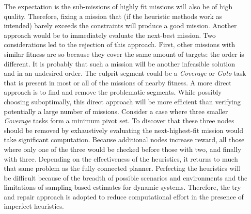 \documentclass{tamuccthesis}
\begin{document}
The expectation is the sub-missions of highly fit missions will also be of high quality. Therefore, fixing a mission that (if the heuristic methods work as intended) barely exceeds the constraints will produce a good mission. Another approach would be to immediately evaluate the next-best mission. Two considerations led to the rejection of this approach. First, other missions with similar fitness are so because they cover the same amount of targets: the order is different. It is probably that such a mission will be another infeasible solution and in an undesired order. The culprit segment could be a \textit{Coverage} or \textit{Goto} task that is present in most or all of the missions of nearby fitness. A more direct approach is to find and remove the problematic segments. While possibly choosing suboptimally, this direct approach will be more efficient than verifying potentially a large number of missions. Consider a case where three smaller \textit{Coverage} tasks form a minimum pivot set. To discover that these three nodes should be removed by exhaustively evaluating the next-highest-fit mission would take significant computation. Because additional nodes increase reward, all those where only one of the three would be checked before those with two, and finally with three. Depending on the effectiveness of the heuristics, it returns to much that same problem as the fully connected planner. Perfecting the heuristics will be difficult because of the breadth of possible scenarios and environments and the limitations of sampling-based estimates for dynamic systems. Therefore, the try and repair approach is adopted to reduce computational effort in the presence of imperfect heuristics. 
\end{document}
